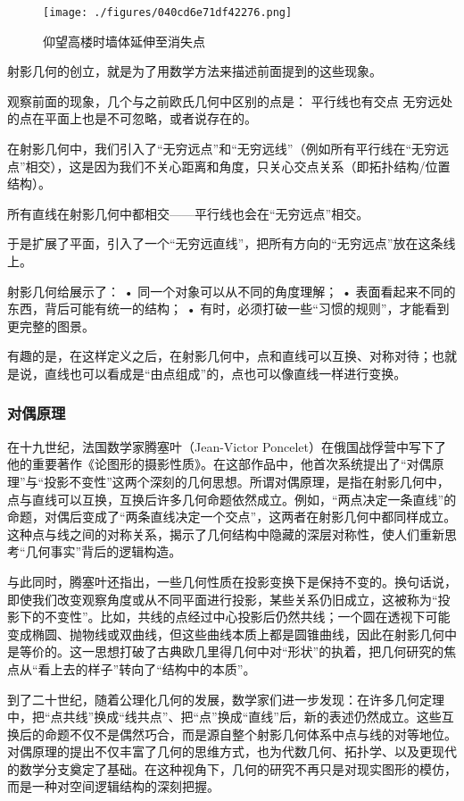 \begin{figure}[ht]
\centering
\texttt{[image: ./figures/040cd6e71df42276.png]}
\caption{仰望高楼时墙体延伸至消失点} \label{fig_HsCsFD_3}
\end{figure}
射影几何的创立，就是为了用数学方法来描述前面提到的这些现象。

观察前面的现象，几个与之前欧氏几何中区别的点是：
平行线也有交点
无穷远处的点在平面上也是不可忽略，或者说存在的。

在射影几何中，我们引入了“无穷远点”和“无穷远线”（例如所有平行线在“无穷远点”相交），这是因为我们不关心距离和角度，只关心交点关系（即拓扑结构/位置结构）。

所有直线在射影几何中都相交——平行线也会在“无穷远点”相交。

于是扩展了平面，引入了一个“无穷远直线”，把所有方向的“无穷远点”放在这条线上。

射影几何给展示了：
	•	同一个对象可以从不同的角度理解；
	•	表面看起来不同的东西，背后可能有统一的结构；
	•	有时，必须打破一些“习惯的规则”，才能看到更完整的图景。

有趣的是，在这样定义之后，在射影几何中，点和直线可以互换、对称对待；也就是说，直线也可以看成是“由点组成”的，点也可以像直线一样进行变换。


\subsubsection{对偶原理}

在十九世纪，法国数学家腾塞叶（Jean-Victor Poncelet）在俄国战俘营中写下了他的重要著作《论图形的摄影性质》。在这部作品中，他首次系统提出了“对偶原理”与“投影不变性”这两个深刻的几何思想。所谓对偶原理，是指在射影几何中，点与直线可以互换，互换后许多几何命题依然成立。例如，“两点决定一条直线”的命题，对偶后变成了“两条直线决定一个交点”，这两者在射影几何中都同样成立。这种点与线之间的对称关系，揭示了几何结构中隐藏的深层对称性，使人们重新思考“几何事实”背后的逻辑构造。

与此同时，腾塞叶还指出，一些几何性质在投影变换下是保持不变的。换句话说，即使我们改变观察角度或从不同平面进行投影，某些关系仍旧成立，这被称为“投影下的不变性”。比如，共线的点经过中心投影后仍然共线；一个圆在透视下可能变成椭圆、抛物线或双曲线，但这些曲线本质上都是圆锥曲线，因此在射影几何中是等价的。这一思想打破了古典欧几里得几何中对“形状”的执着，把几何研究的焦点从“看上去的样子”转向了“结构中的本质”。

到了二十世纪，随着公理化几何的发展，数学家们进一步发现：在许多几何定理中，把“点共线”换成“线共点”、把“点”换成“直线”后，新的表述仍然成立。这些互换后的命题不仅不是偶然巧合，而是源自整个射影几何体系中点与线的对等地位。对偶原理的提出不仅丰富了几何的思维方式，也为代数几何、拓扑学、以及更现代的数学分支奠定了基础。在这种视角下，几何的研究不再只是对现实图形的模仿，而是一种对空间逻辑结构的深刻把握。



